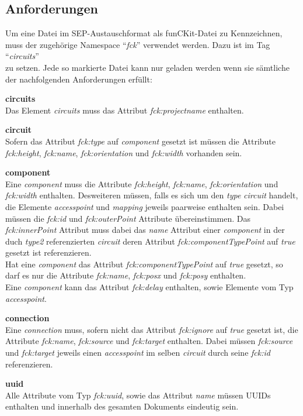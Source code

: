\documentclass[12pt,a4paper]{scrartcl}
\newcommand{\projectName}{funCKit\xspace} %
\newcommand{\fckSEPFormat}{SEP-Austauschformat\xspace}
\begin{document}
\subsection{Anforderungen} 
Um eine Datei im \fckSEPFormat als \projectName-Datei zu Kennzeichnen, muss der zugehörige Namespace ``\textit{fck}'' verwendet werden. Dazu ist im Tag ``\textit{circuits}'' {
	 \\
}
\noindent zu setzen. Jede so markierte Datei kann nur geladen werden wenn sie sämtliche der nachfolgenden Anforderungen erfüllt:
\begin{enum}
	\item \textbf{circuits} \\
		Das Element \textit{circuits} muss das Attribut \textit{fck:projectname} enthalten.
	\item \textbf{circuit} \\
		Sofern das Attribut \textit{fck:type} auf \textit{component} gesetzt ist müssen die Attribute \textit{fck:height}, \textit{fck:name}, \textit{fck:orientation} und \textit{fck:width} vorhanden sein.
	\item \textbf{component} \\
		Eine \textit{component} muss die Attribute \textit{fck:height}, \textit{fck:name}, \textit{fck:orientation} und \textit{fck:width} enthalten. Desweiteren müssen, falls es sich um den \textit{type} \textit{circuit} handelt, die Elemente \textit{accesspoint} und \textit{mapping} jeweils paarweise enthalten sein. Dabei müssen die \textit{fck:id} und \textit{fck:outerPoint} Attribute übereinstimmen. Das \textit{fck:innerPoint} Attribut muss dabei das \textit{name} Attribut einer \textit{component} in der duch \textit{type2} referenzierten \textit{circuit} deren Attribut \textit{fck:componentTypePoint} auf \textit{true} gesetzt ist referenzieren. \\
		Hat eine \textit{component} das Attribut \textit{fck:componentTypePoint} auf \textit{true} gesetzt, so darf es nur die Attribute \textit{fck:name}, \textit{fck:posx} und \textit{fck:posy} enthalten. \\
		Eine \textit{component} kann das Attribut \textit{fck:delay} enthalten, sowie Elemente vom Typ \textit{accesspoint}.
	\item \textbf{connection} \\
		Eine \textit{connection} muss, sofern nicht das Attribut \textit{fck:ignore} auf \textit{true} gesetzt ist, die Attribute \textit{fck:name}, \textit{fck:source} und \textit{fck:target} enthalten. Dabei müssen \textit{fck:source} und \textit{fck:target} jeweils einen \textit{accesspoint} im selben \textit{circuit} durch seine \textit{fck:id} referenzieren.
	\item \textbf{uuid} \\
		Alle Attribute vom Typ \textit{fck:uuid}, sowie das Attribut \textit{name} müssen UUIDs enthalten und innerhalb des gesamten Dokuments eindeutig sein.
\end{enum}
\end{document}
